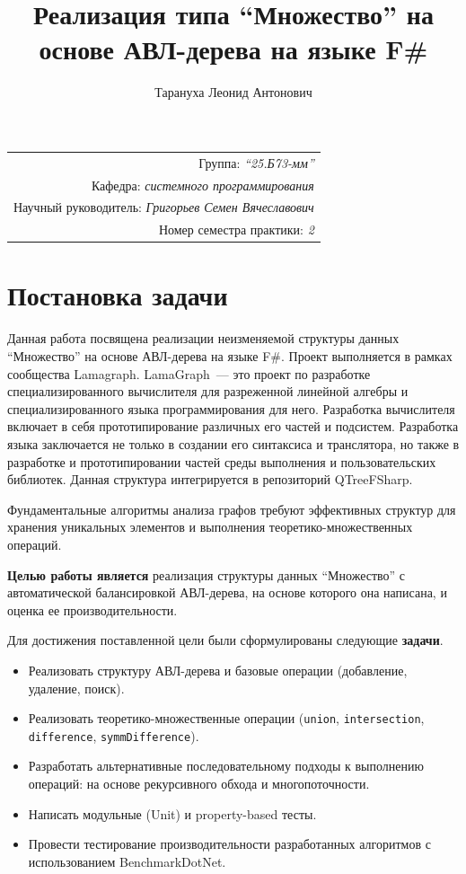 \documentclass[a4paper,12pt]{article}
\title{Реализация типа \enquote{Множество} на основе АВЛ-дерева на языке F\#}
\author{Тарануха Леонид Антонович}
\date{}
\begin{document}
\maketitle

\begin{flushright}
\begin{tabular}{r}
    Группа: \emph{\enquote{25.Б73-мм}} \\
    Кафедра: \emph{системного программирования} \\
    Научный руководитель: \emph{Григорьев Семен Вячеславович} \\
    Номер семестра практики: \emph{2} \\
\end{tabular}
\end{flushright}

\section{Постановка задачи}

Данная работа посвящена реализации неизменяемой структуры данных \enquote{Множество} на основе АВЛ-дерева на языке F\#. Проект выполняется в рамках сообщества Lamagraph. LamaGraph~--- это проект по разработке специализированного вычислителя для разреженной линейной алгебры и специализированного языка программирования для него. Разработка вычислителя включает в себя прототипирование различных его частей и подсистем. Разработка языка заключается не только в создании его синтаксиса и транслятора, но также в разработке и прототипировании частей среды выполнения и пользовательских библиотек. Данная структура интегрируется в репозиторий QTreeFSharp.

Фундаментальные алгоритмы анализа графов требуют эффективных структур для хранения уникальных элементов и выполнения теоретико-множественных операций.

\textbf{Целью работы является} реализация структуры данных \enquote{Множество} с автоматической балансировкой АВЛ-дерева, на основе которого она написана, и оценка ее производительности.

Для достижения поставленной цели были сформулированы следующие \textbf{задачи}.
\begin{itemize}
    \item Реализовать структуру АВЛ-дерева и базовые операции (добавление, удаление, поиск).
    \item Реализовать теоретико-множественные операции (\verb|union|, \verb|intersection|, \verb|difference|, \verb|symmDifference|).
    \item Разработать альтернативные последовательному подходы к выполнению операций: на основе рекурсивного обхода и многопоточности.
    \item Написать модульные (Unit) и property-based тесты.
    \item Провести тестирование производительности разработанных алгоритмов с использованием BenchmarkDotNet.
\end{itemize}
\end{document}
